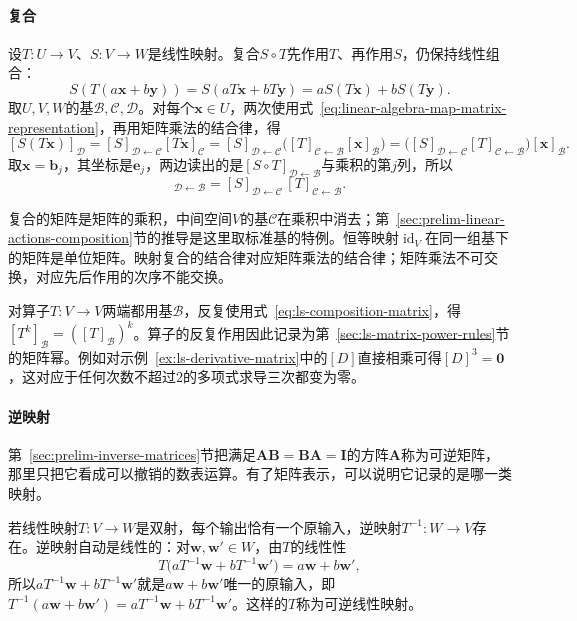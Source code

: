 \paragraph{复合}
设$T:U\to V$、$S:V\to W$是线性映射。复合$S\circ T$先作用$T$、再作用$S$，仍保持线性组合：
\[
 S(T(a\bm x+b\bm y))=S(aT\bm x+bT\bm y)=aS(T\bm x)+bS(T\bm y).
\]
取$U,V,W$的基$\mathcal B,\mathcal C,\mathcal D$。对每个$\bm x\in U$，两次使用式~\eqref{eq:linear-algebra-map-matrix-representation}，再用矩阵乘法的结合律，得
\[
 [S(T\bm x)]_{\mathcal D}
 =[S]_{\mathcal D\leftarrow\mathcal C}[T\bm x]_{\mathcal C}
 =[S]_{\mathcal D\leftarrow\mathcal C}\bigl([T]_{\mathcal C\leftarrow\mathcal B}[\bm x]_{\mathcal B}\bigr)
 =\bigl([S]_{\mathcal D\leftarrow\mathcal C}[T]_{\mathcal C\leftarrow\mathcal B}\bigr)[\bm x]_{\mathcal B}.
\]
取$\bm x=\bm b_j$，其坐标是$\bm e_j$，两边读出的是$[S\circ T]_{\mathcal D\leftarrow\mathcal B}$与乘积的第$j$列，所以
\begin{equation}
 [S\circ T]_{\mathcal D\leftarrow\mathcal B}
 =[S]_{\mathcal D\leftarrow\mathcal C}\,[T]_{\mathcal C\leftarrow\mathcal B}.
 \label{eq:ls-composition-matrix}
\end{equation}

复合的矩阵是矩阵的乘积，中间空间$V$的基$\mathcal C$在乘积中消去；第~\ref{sec:prelim-linear-actions-composition}节的推导是这里取标准基的特例。恒等映射$\operatorname{id}_V$在同一组基下的矩阵是单位矩阵。映射复合的结合律对应矩阵乘法的结合律；矩阵乘法不可交换，对应先后作用的次序不能交换。

对算子$T:V\to V$两端都用基$\mathcal B$，反复使用式~\eqref{eq:ls-composition-matrix}，得$[T^k]_{\mathcal B}=([T]_{\mathcal B})^k$。算子的反复作用因此记录为第~\ref{sec:ls-matrix-power-rules}节的矩阵幂。例如对示例~\ref{ex:ls-derivative-matrix}中的$[D]$直接相乘可得$[D]^3=\bm0$，这对应于任何次数不超过$2$的多项式求导三次都变为零。

\paragraph{逆映射}
第~\ref{sec:prelim-inverse-matrices}节把满足$\bm A\bm B=\bm B\bm A=\bm I$的方阵$\bm A$称为可逆矩阵，那里只把它看成可以撤销的数表运算。有了矩阵表示，可以说明它记录的是哪一类映射。

若线性映射$T:V\to W$是双射，每个输出恰有一个原输入，逆映射$T^{-1}:W\to V$存在。逆映射自动是线性的：对$\bm w,\bm w'\in W$，由$T$的线性性
\[
 T\bigl(aT^{-1}\bm w+bT^{-1}\bm w'\bigr)=a\bm w+b\bm w',
\]
所以$aT^{-1}\bm w+bT^{-1}\bm w'$就是$a\bm w+b\bm w'$唯一的原输入，即$T^{-1}(a\bm w+b\bm w')=aT^{-1}\bm w+bT^{-1}\bm w'$。这样的$T$称为可逆线性映射。


